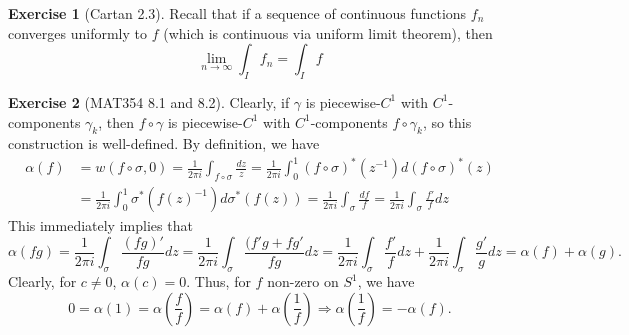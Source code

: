 \documentclass[aps,pra,showpacs,notitlepage,onecolumn,superscriptaddress,nofootinbib]{revtex4-1}
\theoremstyle{definition}
\newtheorem{exercise}{Exercise}[section]
\newcommand{\hhrulefill}{\hspace{-1.5em} \hrulefill}
\begin{document}
\hhrulefill

\begin{exercise}[Cartan 2.3]
  Recall that if a sequence of continuous functions $f_n$ converges uniformly to $f$ (which is continuous via uniform limit theorem), then
  \begin{equation}
    \lim_{n \to \infty} \displaystyle\int_{I} f_n = \displaystyle\int_{I} f
    \end{equation}
\end{exercise}

\hhrulefill

\begin{exercise}[MAT354 8.1 and 8.2]

  Clearly, if $\gamma$ is piecewise-$C^1$ with $C^1$-components $\gamma_k$, then $f \circ \gamma$ is piecewise-$C^1$ with $C^1$-components $f \circ \gamma_k$, so this construction is well-defined. By definition, we have
  \begin{align}
    \alpha(f) & = w(f \circ \sigma, 0) = \frac{1}{2\pi i} \displaystyle\int_{f \circ \sigma} \frac{dz}{z} = \frac{1}{2\pi i} \displaystyle\int_{0}^{1} (f \circ \sigma)^{*}(z^{-1}) d (f \circ \sigma)^{*}(z)
    \\ & = \frac{1}{2\pi i} \displaystyle\int_{0}^{1} \sigma^{*}(f(z)^{-1}) d \sigma^{*}(f(z)) = \frac{1}{2\pi i} \displaystyle\int_{\sigma} \frac{df}{f} = \frac{1}{2\pi i} \displaystyle\int_{\sigma} \frac{f'}{f} dz
  \end{align}
  This immediately implies that
  \begin{equation}
    \alpha(f g) = \frac{1}{2\pi i} \displaystyle\int_{\sigma} \frac{(fg)'}{fg} dz = \frac{1}{2\pi i} \displaystyle\int_{\sigma} \frac{(f'g + f g'}{fg} dz = \frac{1}{2\pi i} \displaystyle\int_{\sigma} \frac{f'}{f} dz + \frac{1}{2\pi i} \displaystyle\int_{\sigma} \frac{g'}{g} dz = \alpha(f) + \alpha(g).
  \end{equation}
  Clearly, for $c \neq 0$, $\alpha(c) = 0$. Thus, for $f$ non-zero on $S^1$, we have
  \begin{equation}
    0 = \alpha(1) = \alpha\left( \frac{f}{f} \right) = \alpha(f) + \alpha\left(\frac{1}{f} \right) \Longrightarrow \alpha\left( \frac{1}{f} \right) = -\alpha(f).
  \end{equation}
\end{exercise}

\hhrulefill
\end{document}
